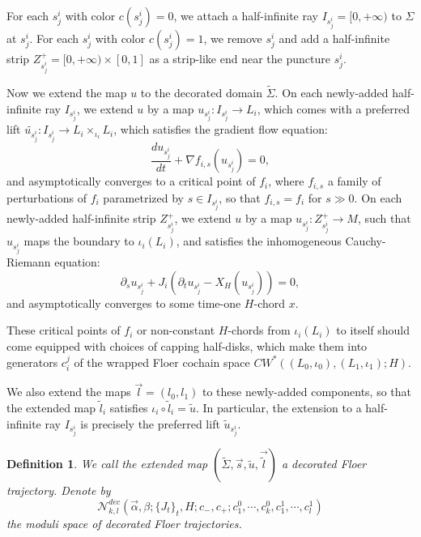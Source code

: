 \documentclass{amsart}
\newtheorem{definition}[theorem]{Definition}
\numberwithin{equation}{section}
\numberwithin{figure}{section}
\begin{document}
	For each $s^{i}_{j}$ with color $c(s^{i}_{j}) = 0$, we attach a half-infinite ray $I_{s^{i}_{j}} = [0, +\infty)$ to $\Sigma$ at $s^{i}_{j}$. For each $s^{i}_{j}$ with color $c(s^{i}_{j}) = 1$, we remove $s^{i}_{j}$ and add a half-infinite strip $Z_{s^{i}_{j}}^{+} = [0, +\infty) \times [0, 1]$ as a strip-like end near the puncture $s^{i}_{j}$. \par
	Now we extend the map $u$ to the decorated domain $\tilde{\Sigma}$. On each newly-added half-infinite ray $I_{s^{i}_{j}}$, we extend $u$ by a map $u_{s^{i}_{j}}: I_{s^{i}_{j}} \to L_{i}$, which comes with a preferred lift $\tilde{u_{s^{i}_{j}}}: I_{s^{i}_{j}} \to L_{i} \times_{\iota_{i}} L_{i}$, which satisfies the gradient flow equation:
\begin{equation}
\frac{du_{s^{i}_{j}}}{dt} + \nabla f_{i, s}(u_{s^{i}_{j}}) = 0,
\end{equation}
and asymptotically converges to a critical point of $f_{i}$, where $f_{i, s}$ a family of perturbations of $f_{i}$ parametrized by $s \in I_{s^{i}_{j}}$, so that $f_{i, s} = f_{i}$ for $s \gg 0$. On each newly-added half-infinite strip $Z_{s^{i}_{j}}^{+}$, we extend $u$ by a map $u_{s^{i}_{j}}: Z_{s^{i}_{j}}^{+} \to M$, such that $u_{s^{i}_{j}}$ maps the boundary to $\iota_{i}(L_{i})$, and satisfies the inhomogeneous Cauchy-Riemann equation:
\begin{equation}
\partial_{s}u_{s^{i}_{j}} + J_{i}(\partial_{t}u_{s^{i}_{j}} - X_{H}(u_{s^{i}_{j}})) = 0,
\end{equation}
and asymptotically converges to some time-one $H$-chord $x$. \par
	These critical points of $f_{i}$ or non-constant $H$-chords from $\iota_{i}(L_{i})$ to itself should come equipped with choices of capping half-disks, which make them into generators $c_{i}^{j}$ of the wrapped Floer cochain space $CW^{*}((L_{0}, \iota_{0}), (L_{1}, \iota_{1}); H)$. \par
	We also extend the maps $\vec{l} = (l_{0}, l_{1})$ to these newly-added components, so that the extended map $\tilde{l}_{i}$ satisfies $\iota_{i} \circ \tilde{l}_{i} = \tilde{u}$. In particular, the extension to a half-infinite ray $I_{s^{i}_{j}}$ is precisely the preferred lift $\tilde{u}_{s^{i}_{j}}$. \par

\begin{definition}
	We call the extended map $(\tilde{\Sigma}, \vec{s}, \tilde{u}, \vec{\tilde{l}})$ a decorated Floer trajectory. Denote by 
\begin{equation}
\mathcal{N}_{k, l}^{dec}(\vec{\alpha}, \beta; \{J_{t}\}_{t}, H; c_{-}, c_{+}; c^{0}_{1}, \cdots, c^{0}_{k}, c^{1}_{1}, \cdots, c^{1}_{l})
\end{equation}
the moduli space of decorated Floer trajectories.
\end{definition}
\end{document}

